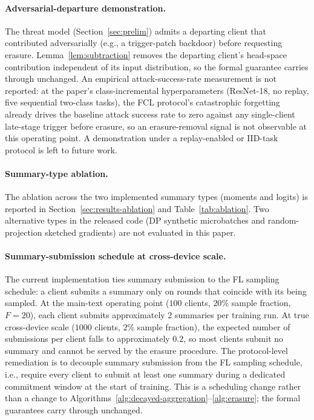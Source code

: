 \paragraph{Adversarial-departure demonstration.}
The threat model (Section~\ref{sec:prelim}) admits a departing client that
contributed adversarially (e.g., a trigger-patch backdoor) before requesting
erasure. Lemma~\ref{lem:subtraction} removes the departing client's
head-space contribution independent of its input distribution, so the formal
guarantee carries through unchanged. An empirical attack-success-rate measurement
is not reported: at the paper's class-incremental hyperparameters (ResNet-18, no
replay, five sequential two-class tasks), the FCL protocol's catastrophic
forgetting already drives the baseline attack success rate to zero against any
single-client late-stage trigger before erasure, so an erasure-removal signal is
not observable at this operating point. A demonstration under a replay-enabled or IID-task protocol is
left to future work.

\paragraph{Summary-type ablation.}
The ablation across the two implemented summary types (moments and logits) is
reported in Section~\ref{sec:results-ablation} and Table~\ref{tab:ablation}. Two
alternative types in the released code (DP synthetic microbatches
\cite{harder2021dpmerf} and random-projection sketched gradients) are not evaluated
in this paper.

\paragraph{Summary-submission schedule at cross-device scale.}
The current implementation ties summary submission to the FL sampling schedule: a
client submits a summary only on rounds that coincide with its being sampled. At
the main-text operating point ($100$ clients, $20\%$ sample fraction, $F{=}20$),
each client submits approximately $2$ summaries per training run. At true
cross-device scale ($1000$ clients, $2\%$ sample fraction), the expected number of
submissions per client falls to approximately $0.2$, so most clients submit no
summary and cannot be served by the erasure procedure. The protocol-level
remediation is to decouple summary submission from the FL sampling schedule, i.e.,
require every client to submit at least one summary during a dedicated commitment
window at the start of training. This is a scheduling change rather than a change
to Algorithms~\ref{alg:decayed-aggregation}--\ref{alg:erasure}; the formal
guarantees carry through unchanged.
